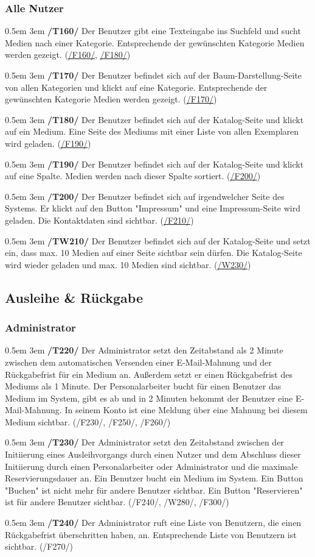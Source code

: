 \documentclass{article}
\newcommand{\specification}[3]{
	{\parindent 0.5em \hangindent 3em \hypertarget{spec:#1:#2}{\textbf{/#1#2/}} #3 \par \nobreak \vspace*{0.5em}}
}
\begin{document}
		\subsubsection{Alle Nutzer}
			\specification{T}{160}{Der Benutzer gibt eine Texteingabe ins Suchfeld und sucht Medien nach einer Kategorie. Entsprechende der gewünschten Kategorie Medien werden gezeigt. (\hyperlink{spec:F:160}{/F160/}, \hyperlink{spec:F:180}{/F180/}) }
			\specification{T}{170}{Der Benutzer befindet sich auf der Baum-Darstellung-Seite von allen Kategorien und klickt auf eine Kategorie. Entsprechende der gewünschten Kategorie Medien werden gezeigt. (\hyperlink{spec:F:170}{/F170/}) }
			\specification{T}{180}{Der Benutzer befindet sich auf der Katalog-Seite und klickt auf ein Medium. Eine Seite des Mediums mit einer Liste von allen Exemplaren wird geladen. (\hyperlink{spec:F:190}{/F190/}) }
			\specification{T}{190}{Der Benutzer befindet sich auf der Katalog-Seite und klickt auf eine Spalte. Medien werden nach dieser Spalte sortiert. (\hyperlink{spec:F:200}{/F200/}) }
			\specification{T}{200}{Der Benutzer befindet sich auf irgendwelcher Seite des Systems. Er klickt auf den Button "Impressum" und eine Impressum-Seite wird geladen. Die Kontaktdaten sind sichtbar. (\hyperlink{spec:F:210}{/F210/}) }
			\specification{TW}{210}{Der Benutzer befindet sich auf der Katalog-Seite und setzt ein, dass max. 10 Medien auf einer Seite sichtbar sein dürfen. 
				Die Katalog-Seite wird wieder geladen und max. 10 Medien sind sichtbar. (\hyperlink{spec:W:230}{/W230/})}
			\subsection{Ausleihe \& Rückgabe}
		\subsubsection{Administrator}
			\specification{T}{220}{Der Administrator setzt den Zeitabstand als 2 Minute zwischen dem automatischen Versenden einer E-Mail-Mahnung und der Rückgabefrist für ein Medium an. 
				Außerdem setzt er einen Rückgabefrist des Mediums als 1 Minute. Der Personalarbeiter bucht für einen Benutzer das Medium im System, gibt es ab und in 2 Minuten bekommt der Benutzer eine E-Mail-Mahnung. 
				In seinem Konto ist eine Meldung über eine Mahnung bei diesem Medium sichtbar. (/F230/, /F250/, /F260/)}
			\specification{T}{230}{Der Administrator setzt den Zeitabstand zwischen der Initiierung eines Ausleihvorgangs durch einen Nutzer und dem Abschluss dieser Initiierung durch einen Personalarbeiter oder Administrator 
				und die maximale Reservierungsdauer an. Ein Benutzer bucht ein Medium im System. Ein Button "Buchen" ist nicht mehr für andere Benutzer sichtbar. 
				Ein Button "Reservieren" ist für andere Benutzer sichtbar. (/F240/, /W280/, /F300/)}
			\specification{T}{240}{Der Administrator ruft eine Liste von Benutzern, die einen Rückgabefrist überschritten haben, an. Entsprechende Liste von Benutzern ist sichtbar. (/F270/)}
\end{document}
